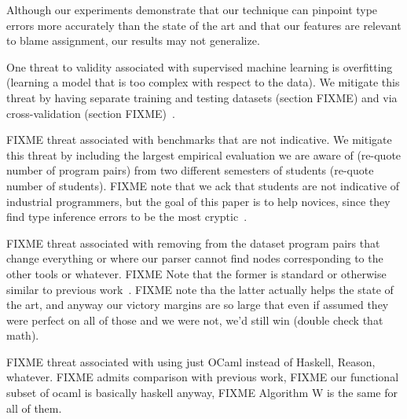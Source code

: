 Although our experiments demonstrate that our technique can pinpoint type
errors more accurately than the state of the art and that our features are
relevant to blame assignment, our results may not generalize. 

One threat to validity associated with supervised machine learning is
overfitting (\ie learning a model that is too complex with respect to the
data). We mitigate this threat by having separate training and testing
datasets (section FIXME) and via cross-validation (section
FIXME)~\cite{FIXME}. 

FIXME threat associated with benchmarks that are not indicative. We
mitigate this threat by including the largest empirical evaluation we are
aware of (re-quote number of program pairs) from two different semesters of
students (re-quote number of students). FIXME note that we ack that
students are not indicative of industrial programmers, but the goal of this
paper is to help novices, since they find type inference errors to be the
most cryptic~\cite{FIXME}. 

FIXME threat associated with removing from the dataset program pairs
that change everything or where our parser cannot find nodes corresponding
to the other tools or whatever. FIXME Note that the former is
standard or otherwise similar to previous work~\cite{FIXME}. FIXME note tha
the latter actually helps the state of the art, and anyway our victory
margins are so large that even if assumed they were perfect on all of those
and we were not, we'd still win (double check that math). 

FIXME threat associated with using just OCaml instead of Haskell, Reason,
whatever. FIXME admits comparison with previous work, FIXME our functional
subset of ocaml is basically haskell anyway, FIXME Algorithm W is the same
for all of them.



